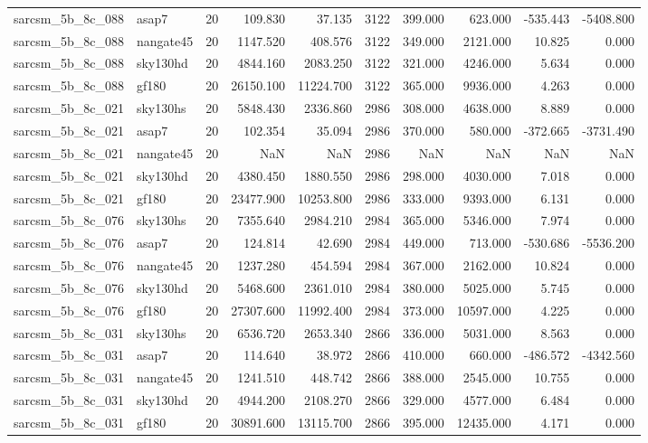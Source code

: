 \begin{tabular}{llrrrrrrrr}
sarcsm\_5b\_8c\_088 & asap7 & 20 & 109.830 & 37.135 & 3122 & 399.000 & 623.000 & -535.443 & -5408.800 \\
sarcsm\_5b\_8c\_088 & nangate45 & 20 & 1147.520 & 408.576 & 3122 & 349.000 & 2121.000 & 10.825 & 0.000 \\
sarcsm\_5b\_8c\_088 & sky130hd & 20 & 4844.160 & 2083.250 & 3122 & 321.000 & 4246.000 & 5.634 & 0.000 \\
sarcsm\_5b\_8c\_088 & gf180 & 20 & 26150.100 & 11224.700 & 3122 & 365.000 & 9936.000 & 4.263 & 0.000 \\
sarcsm\_5b\_8c\_021 & sky130hs & 20 & 5848.430 & 2336.860 & 2986 & 308.000 & 4638.000 & 8.889 & 0.000 \\
sarcsm\_5b\_8c\_021 & asap7 & 20 & 102.354 & 35.094 & 2986 & 370.000 & 580.000 & -372.665 & -3731.490 \\
sarcsm\_5b\_8c\_021 & nangate45 & 20 & NaN & NaN & 2986 & NaN & NaN & NaN & NaN \\
sarcsm\_5b\_8c\_021 & sky130hd & 20 & 4380.450 & 1880.550 & 2986 & 298.000 & 4030.000 & 7.018 & 0.000 \\
sarcsm\_5b\_8c\_021 & gf180 & 20 & 23477.900 & 10253.800 & 2986 & 333.000 & 9393.000 & 6.131 & 0.000 \\
sarcsm\_5b\_8c\_076 & sky130hs & 20 & 7355.640 & 2984.210 & 2984 & 365.000 & 5346.000 & 7.974 & 0.000 \\
sarcsm\_5b\_8c\_076 & asap7 & 20 & 124.814 & 42.690 & 2984 & 449.000 & 713.000 & -530.686 & -5536.200 \\
sarcsm\_5b\_8c\_076 & nangate45 & 20 & 1237.280 & 454.594 & 2984 & 367.000 & 2162.000 & 10.824 & 0.000 \\
sarcsm\_5b\_8c\_076 & sky130hd & 20 & 5468.600 & 2361.010 & 2984 & 380.000 & 5025.000 & 5.745 & 0.000 \\
sarcsm\_5b\_8c\_076 & gf180 & 20 & 27307.600 & 11992.400 & 2984 & 373.000 & 10597.000 & 4.225 & 0.000 \\
sarcsm\_5b\_8c\_031 & sky130hs & 20 & 6536.720 & 2653.340 & 2866 & 336.000 & 5031.000 & 8.563 & 0.000 \\
sarcsm\_5b\_8c\_031 & asap7 & 20 & 114.640 & 38.972 & 2866 & 410.000 & 660.000 & -486.572 & -4342.560 \\
sarcsm\_5b\_8c\_031 & nangate45 & 20 & 1241.510 & 448.742 & 2866 & 388.000 & 2545.000 & 10.755 & 0.000 \\
sarcsm\_5b\_8c\_031 & sky130hd & 20 & 4944.200 & 2108.270 & 2866 & 329.000 & 4577.000 & 6.484 & 0.000 \\
sarcsm\_5b\_8c\_031 & gf180 & 20 & 30891.600 & 13115.700 & 2866 & 395.000 & 12435.000 & 4.171 & 0.000 \\

\end{tabular}
